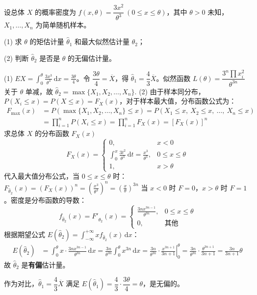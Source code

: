 \documentclass[lang=cn,11pt]{elegantbook}
\begin{document}
\begin{exercise}\label{exer:7-mono-3x2}
设总体 \(X\) 的概率密度为 \(f(x,\theta) = \dfrac{3x^2}{\theta^3}\ (0 \leq x \leq \theta)\)，其中 \(\theta > 0\) 未知，\(X_1, \dots, X_n\) 为简单随机样本。\par
(1) 求 \(\theta\) 的矩估计量 \(\hat{\theta}_1\) 和最大似然估计量 \(\hat{\theta}_2\)；\par
(2) 判断 \(\hat{\theta}_2\) 是否是 \(\theta\) 的无偏估计量。
\end{exercise}
\begin{solution}
(1) \(EX = \displaystyle\int_0^\theta \frac{3x^3}{\theta^3}\,\mathrm{d}x = \frac{3\theta}{4}\)。令 \(\dfrac{3\theta}{4} = \overline{X}\)，得 \(\hat{\theta}_1 = \dfrac{4}{3}\overline{X}\)。似然函数 \(L(\theta) = \dfrac{3^n\prod x_i^2}{\theta^{3n}}\) 关于 \(\theta\) 单减，故
\(
\hat{\theta}_2 = \max\{X_1, X_2, \dots, X_n\}.
\)
(2) 由于样本同分布，$P(X_i \le x) = P(X \le x) = F_X(x)$，对于样本最大值，分布函数公式为：
\begin{align*}
F_{\max}(x) &= P\left(\max\{X_1,X_2,\dots,X_n\} \leq x\right) = P\left(X_1 \leq x,\ X_2 \leq x,\ \dots,\ X_n \leq x\right)\\
&= \prod_{i=1}^n P(X_i \leq x) = \prod_{i=1}^n F_X(x) = \left[F_X(x)\right]^n
\end{align*}
求总体 $X$ 的分布函数 $F_X(x)$
$$F_X(x) =
\begin{cases}
0, & x<0 \\
\displaystyle \int_{0}^{x} \frac{3t^2}{\theta^3}\,\mathrm{d}t = \frac{x^3}{\theta^3}, & 0\leq x\leq\theta \\
1, & x>\theta
\end{cases}$$
代入最大值分布公式，当 $0\leq x\leq\theta$ 时：
\(F_{\hat{\theta}_2}(x) = \left(F_X(x)\right)^n = \left(\frac{x^3}{\theta^3}\right)^n = \left(\frac{x}{\theta}\right)^{3n}\)
当 $x<0$ 时 $F=0$，$x>\theta$ 时 $F=1$。密度是分布函数的导数：
$$f_{\hat{\theta}_2}(x) = F'_{\hat{\theta}_2}(x) =\begin{cases}\displaystyle \frac{3n x^{3n-1}}{\theta^{3n}}, & 0\leq x\leq\theta \\0, & \text{其他}\end{cases}$$
根据期望公式 $E(\hat{\theta}_2) = \int_{-\infty}^{+\infty} x f_{\hat{\theta}_2}(x)\,\mathrm{d}x$：
$$\begin{aligned}
E(\hat{\theta}_2) &= \int_{0}^{\theta} x \cdot \frac{3n x^{3n-1}}{\theta^{3n}}\,\mathrm{d}x = \frac{3n}{\theta^{3n}} \int_{0}^{\theta} x^{3n}\,\mathrm{d}x = \frac{3n}{\theta^{3n}} \cdot \left. \frac{x^{3n+1}}{3n+1} \right|_{0}^{\theta} = \frac{3n}{\theta^{3n}} \cdot \frac{\theta^{3n+1}}{3n+1} = \frac{3n}{3n+1} \theta
\end{aligned}$$
故 \(\hat{\theta}_2\) 是\textbf{有偏}估计量。
\begin{note}
作为对比，\(\hat{\theta}_1 = \dfrac{4}{3}\overline{X}\) 满足 \(E(\hat{\theta}_1) = \dfrac{4}{3}\cdot\dfrac{3\theta}{4} = \theta\)，是无偏的。
\end{note}
\end{solution}
\end{document}
